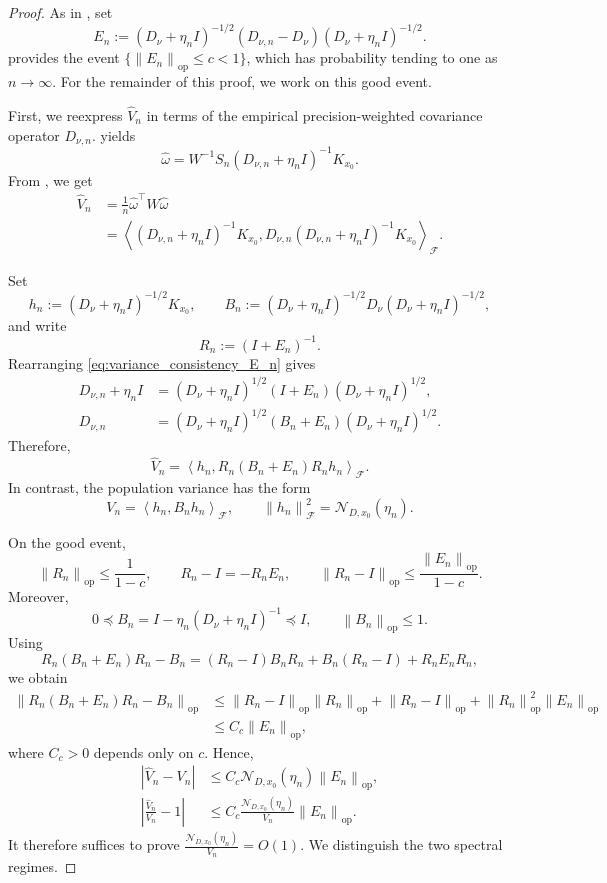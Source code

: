 \documentclass[11pt]{article}
\newcommand{\F}{\mathcal{F}}
\newcommand{\Ncal}{\mathcal{N}}
\newcommand{\op}{\mathrm{op}}
\newcommand{\inner}[2]{\left\langle #1,#2\right\rangle}
\newcommand{\norm}[1]{\left\lVert #1\right\rVert}
\newcommand{\abs}[1]{\left\lvert #1\right\rvert}
\newcommand{\preceqL}{\preceq}
\begin{document}
\begin{proof}

As in , set
\begin{equation}
  E_n:=(D_\nu+\eta_n I)^{-1/2}(D_{\nu,n}-D_\nu)(D_\nu+\eta_n I)^{-1/2}.
  \label{eq:variance_consistency_E_n}
\end{equation}
 provides the event
$\{\norm{E_n}_{\op}\leq c<1\}$, which has probability tending to one as $n\to\infty$.
For the remainder of this proof, we work on this good event.

First, we reexpress $\widehat V_n$ in terms of the empirical precision-weighted covariance operator $D_{\nu,n}$.  yields
\[
 \widehat\omega=W^{-1}S_n(D_{\nu,n}+\eta_n I)^{-1}K_{x_0}.
\]
From , we get
\begin{align*}
 \widehat V_n
 &=\frac1n\widehat\omega^\top W\widehat\omega\\
 &=\inner{(D_{\nu,n}+\eta_n I)^{-1}K_{x_0}}
 {D_{\nu,n}(D_{\nu,n}+\eta_n I)^{-1}K_{x_0}}_{\F}.
\end{align*}

Set
\[
  h_n:=(D_\nu+\eta_n I)^{-1/2}K_{x_0},\qquad
  B_n:=(D_\nu+\eta_n I)^{-1/2}D_\nu(D_\nu+\eta_n I)^{-1/2},
\]
and write
\[
  R_n:=(I+E_n)^{-1}.
\]
Rearranging \eqref{eq:variance_consistency_E_n} gives
\begin{align*}
  D_{\nu,n}+\eta_n I
  &=(D_\nu+\eta_n I)^{1/2}(I+E_n)(D_\nu+\eta_n I)^{1/2},\\
  D_{\nu,n}
  &=(D_\nu+\eta_n I)^{1/2}(B_n+E_n)(D_\nu+\eta_n I)^{1/2}.
\end{align*}
Therefore,
\[
  \widehat V_n
  =\inner{h_n}{R_n(B_n+E_n)R_nh_n}_{\F}.
\]
In contrast, the population variance has the form
\[
  V_n=\inner{h_n}{B_nh_n}_{\F},\qquad
  \norm{h_n}_{\F}^2=\Ncal_{D,x_0}(\eta_n).
\]

On the good event,
\[
  \norm{R_n}_{\op}\leq\frac{1}{1-c},
  \qquad
  R_n-I=-R_nE_n,
  \qquad
  \norm{R_n-I}_{\op}\leq\frac{\norm{E_n}_{\op}}{1-c}.
\]
Moreover,
\[
  0\preceqL B_n=I-\eta_n(D_\nu+\eta_n I)^{-1}\preceqL I,
  \qquad \norm{B_n}_{\op}\leq1.
\]
Using
\[
  R_n(B_n+E_n)R_n-B_n
  =(R_n-I)B_nR_n+B_n(R_n-I)+R_nE_nR_n,
\]
we obtain
\begin{align*}
  \norm{R_n(B_n+E_n)R_n-B_n}_{\op}
  &\leq \norm{R_n-I}_{\op}\norm{R_n}_{\op}
  +\norm{R_n-I}_{\op}
  +\norm{R_n}_{\op}^2\norm{E_n}_{\op}\\
  &\leq C_c\norm{E_n}_{\op},
\end{align*}
where $C_c>0$ depends only on $c$. Hence,
\begin{align*}
  \abs{\widehat V_n-V_n}
  &\leq C_c\Ncal_{D,x_0}(\eta_n)\norm{E_n}_{\op},\\
  \abs{\frac{\widehat V_n}{V_n}-1}
  &\leq C_c\frac{\Ncal_{D,x_0}(\eta_n)}{V_n}\norm{E_n}_{\op}.
\end{align*}
It therefore suffices to prove $\frac{\Ncal_{D,x_0}(\eta_n)}{V_n}=O(1)$. We distinguish the two spectral regimes.


\end{proof}
\end{document}
